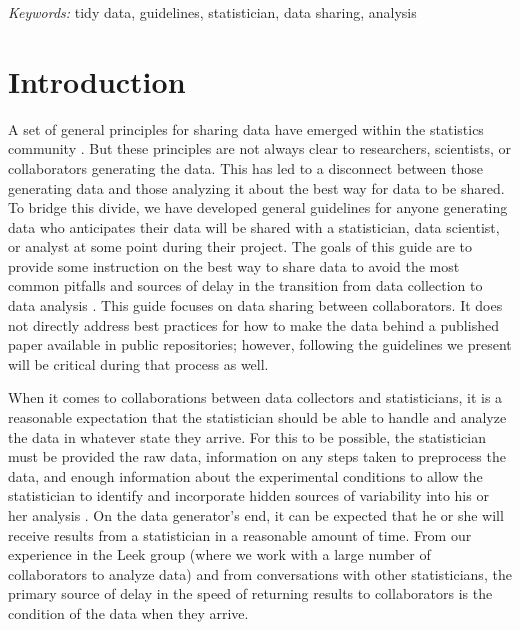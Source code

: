 \documentclass[12pt]{article}
\begin{document}
\noindent%
{\it Keywords:} tidy data, guidelines, statistician, data sharing, analysis
\vfill

\newpage
{} %

\section{Introduction}\label{introduction}

A set of general principles for sharing data have emerged within the
statistics community
\citep[\citet{_tidy_data},\citet{wilson_best_2014},\citet{wilson_good_2017},\citet{white_nine_2013}]{broman_data_2017}.
But these principles are not always clear to researchers, scientists, or
collaborators generating the data. This has led to a disconnect between
those generating data and those analyzing it about the best way for data
to be shared. To bridge this divide, we have developed general
guidelines for anyone generating data who anticipates their data will be
shared with a statistician, data scientist, or analyst at some point
during their project. The goals of this guide are to provide some
instruction on the best way to share data to avoid the most common
pitfalls and sources of delay in the transition from data collection to
data analysis \citep{leek2015opinion}. This guide focuses on data
sharing between collaborators. It does not directly address best
practices for how to make the data behind a published paper available in
public repositories; however, following the guidelines we present will
be critical during that process as well.

When it comes to collaborations between data collectors and
statisticians, it is a reasonable expectation that the statistician
should be able to handle and analyze the data in whatever state they
arrive. For this to be possible, the statistician must be provided the
raw data, information on any steps taken to preprocess the data, and
enough information about the experimental conditions to allow the
statistician to identify and incorporate hidden sources of variability
into his or her analysis \citep{baggerly2010disclose}. On the data
generator's end, it can be expected that he or she will receive results
from a statistician in a reasonable amount of time. From our experience
in the Leek group (where we work with a large number of collaborators to
analyze data) and from conversations with other statisticians, the
primary source of delay in the speed of returning results to
collaborators is the condition of the data when they arrive.
\end{document}
